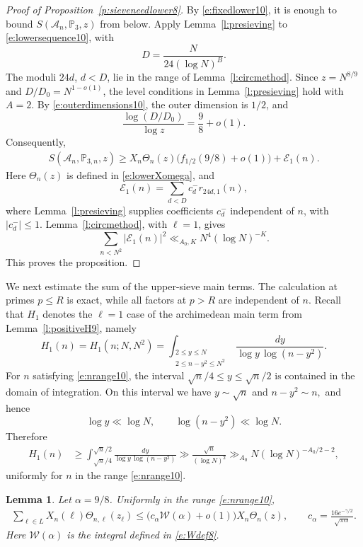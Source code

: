 \documentclass[12pt,reqno]{amsart}
\numberwithin{equation}{section}
\newtheorem{lemma}[equation]{Lemma}
\theoremstyle{definition}
\theoremstyle{remark}
\begin{document}
\begin{proof}[Proof of Proposition~\ref{p:sieveneedlower8}]
By \eqref{e:fixedlower10}, it is enough to bound
\(S(\mathcal A_n,\mathbb P_3,z)\) from below.  Apply
Lemma~\ref{l:presieving} to \eqref{e:lowersequence10}, with
\[
 D=\frac{N}{24(\log N)^B}.
\]
The moduli \(24d\), \(d<D\), lie in the range of
Lemma~\ref{l:circmethod}. Since \(z=N^{8/9}\) and \(D/D_0=N^{1-o(1)}\), the level
conditions in Lemma~\ref{l:presieving} hold with \(A=2\).
  By \eqref{e:outerdimensions10}, the outer
dimension is \(1/2\), and
\[
 \frac{\log(D/D_0)}{\log z}=\frac98+o(1).
\]
Consequently,
\begin{align}\label{e:lowerbound10}
 S(\mathcal A_n,\mathbb P_{3,n},z)
 \geq X_n\Theta_n(z)
 \bigl(f_{1/2}(9/8)+o(1)\bigr)+\mathcal E_1(n).
\end{align}
Here \(\Theta_n(z)\) is defined in \eqref{e:lowerXomega}, and
\[
 \mathcal E_1(n)=\sum_{d<D}c_d^-r_{24d,1}(n),
\]
where Lemma~\ref{l:presieving} supplies coefficients \(c_d^-\)
independent of \(n\), with \(|c_d^-|\leq1\).
Lemma~\ref{l:circmethod}, with \(\ell=1\), gives
\[
 \sum_{n<N^2}|\mathcal E_1(n)|^2
 \ll_{A_0,K}N^4(\log N)^{-K}.
\]
This proves the proposition.
\end{proof}
We next estimate the sum of the upper-sieve main terms.  The calculation
at primes \(p\leq R\) is exact, while all factors at \(p>R\) are
independent of \(n\).  Recall that \(H_1\) denotes the \(\ell=1\) case of
the archimedean main term from Lemma~\ref{l:positiveH9}, namely
\[
 H_1(n)= H_1(n;N,N^2) =
 \int_{\substack{2\leq y\leq N\\ 2\leq n-y^2\leq N^2}}
 \frac{dy}{\log y\,\log(n-y^2)} .
\]
For \(n\) satisfying \eqref{e:nrange10}, the interval $\sqrt n/4\leq y\leq \sqrt n/2$
is contained in the domain of integration.  On this interval we have $y\sim \sqrt n$ and $n-y^2\sim n,$
and hence
\[
 \log y\ll \log N,\qquad \log(n-y^2)\ll \log N.
\]
Therefore
\begin{align}\label{e:H1elementary10}
 H_1(n)
 &\geq
 \int_{\sqrt n/4}^{\sqrt n/2}
 \frac{dy}{\log y\,\log(n-y^2)}
 \gg \frac{\sqrt n}{(\log N)^2}
 \gg_{A_0} N(\log N)^{-A_0/2-2},
\end{align}
uniformly for \(n\) in the range \eqref{e:nrange10}.




\begin{lemma}
\label{l:wumatomakisum}
Let \(\alpha=9/8\).  Uniformly in the range \eqref{e:nrange10},
\begin{align}\label{e:wumatomakisum10}
 \sum_{\ell\in L}X_n(\ell)\Theta_{n,\ell}(z_\ell)
 \leq
 \bigl(c_\alpha\mathcal W(\alpha)+o(1)\bigr)
 X_n\Theta_n(z),
 \qquad
 c_\alpha=\frac{16e^{-\gamma/2}}{\sqrt{\pi\alpha}}.
\end{align}
Here \(\mathcal W(\alpha)\) is the integral defined in
\eqref{e:Wdef8}.
\end{lemma}
\end{document}
